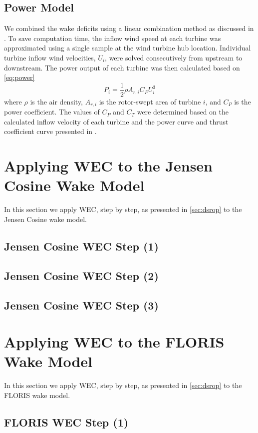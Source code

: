 \documentclass[a4paper]{jpconf}
\begin{document}
\subsection{Power Model}
We combined the wake deficits using a linear combination method as discussed in \cite{niayifar2016}. To save computation time, the inflow wind speed at each turbine was approximated using a single sample at the wind turbine hub location. Individual turbine inflow wind velocities, $U_i$, were solved consecutively from upstream to downstream. The power output of each turbine was then calculated based on \cref{eq:power}
%
\begin{equation}\label{eq:power}
P_i = \frac{1}{2}\rho A_{r,i}C_P U_i^3
\end{equation}
%
where $\rho$ is the air density, $A_{r,i}$ is the rotor-swept area of turbine $i$, and $C_P$ is the power coefficient. The values of $C_P$ and $C_T$ were determined based on the calculated inflow velocity of each turbine and the power curve and thrust coefficient curve presented in \cite{niayifar2016}.

\section{Applying WEC to the Jensen Cosine Wake Model}
In this section we apply WEC, step by step, as presented in \cref{sec:dsrop} to the Jensen Cosine wake model.  

\subsection{Jensen Cosine WEC Step (1)}
\subsection{Jensen Cosine WEC Step (2)}
\subsection{Jensen Cosine WEC Step (3)}

\section{Applying WEC to the FLORIS Wake Model}
In this section we apply WEC, step by step, as presented in \cref{sec:dsrop} to the FLORIS wake model.  

\subsection{FLORIS WEC Step (1)}
\end{document}

